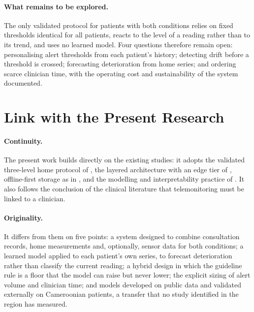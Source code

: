 \paragraph{What remains to be explored.} The only validated protocol for patients with both conditions \parencite{mihevc2025} relies on fixed thresholds identical for all patients, reacts to the level of a reading rather than to its trend, and uses no learned model. Four questions therefore remain open: personalising alert thresholds from each patient's history; detecting drift before a threshold is crossed; forecasting deterioration from home series; and ordering scarce clinician time, with the operating cost and sustainability of the system documented.

\section{Link with the Present Research}\label{sec:research-questions}\label{sec:link}\label{sec:intro-hypotheses}

\paragraph{Continuity.} The present work builds directly on the existing studies: it adopts the validated three-level home protocol of \textcite{mihevc2025}, the layered architecture with an edge tier of \textcite{mucchi2021}, offline-first storage as in \textcite{efendi2025}, and the modelling and interpretability practice of \textcite{mendoza2025}. It also follows the conclusion of the clinical literature that telemonitoring must be linked to a clinician.

\paragraph{Originality.} It differs from them on five points: a system designed to combine consultation records, home measurements and, optionally, sensor data for both conditions; a learned model applied to each patient's own series, to forecast deterioration rather than classify the current reading; a hybrid design in which the guideline rule is a floor that the model can raise but never lower; the explicit sizing of alert volume and clinician time; and models developed on public data and validated externally on Cameroonian patients, a transfer that no study identified in the region has measured.

